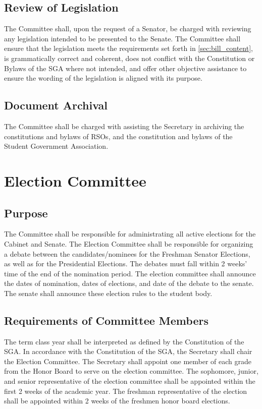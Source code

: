 \documentclass[12pt]{scrreprt}
\begin{document}
\subsection{Review of Legislation}
The Committee shall, upon the request of a Senator, be charged with reviewing any legislation intended to be presented to the Senate. The Committee shall ensure that the legislation meets the requirements set forth in \ref{sec:bill_content}, is grammatically correct and coherent, does not conflict with the Constitution or Bylaws of the SGA where not intended, and offer other objective assistance to ensure the wording of the legislation is aligned with its purpose.

\subsection{Document Archival} \label{sec:document_archival}
The Committee shall be charged with assisting the Secretary in archiving the 
constitutions and bylaws of RSOs, and the constitution and bylaws of the 
Student Government Association.

\section{Election Committee}

\subsection{Purpose}
The Committee shall be responsible for administrating all active elections for 
the Cabinet and Senate. The Election Committee shall be responsible for organizing a debate between the candidates/nominees for the Freshman Senator Elections, as well as for the
Presidential Elections. The debates must fall within 2 weeks’ time of the end of the
nomination period. The election committee shall announce the dates of
nomination, dates of elections, and date of the debate to the senate. The senate
shall announce these election rules to the student body. 

\subsection{Requirements of Committee Members}
The term class year shall be interpreted as defined by the Constitution of the 
SGA. In accordance with the Constitution of the SGA, the Secretary shall chair the Election Committee. The Secretary shall appoint one member of each grade from
the Honor Board to serve on the election committee. The sophomore, junior, and
senior representative of the election committee shall be appointed within the first 2
weeks of the academic year. The freshman representative of the election shall be
appointed within 2 weeks of the freshmen honor board elections.
\end{document}
